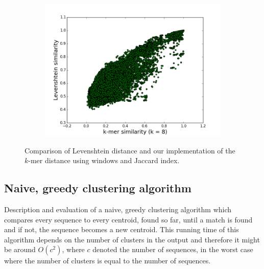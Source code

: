 \begin{figure}
  \centering
  \begin{subfigure}[b]{0.5\textwidth}
    \includegraphics[scale=0.34]{graphics/k8.png}
  \end{subfigure}
  \caption{Comparison of Levenshtein distance and our implementation of the
  $k$-mer distance using windows and Jaccard index.}
  \label{fig:Levenshtein_vs_Kmer}
\end{figure}


\subsection{Naive, greedy clustering algorithm} %
Description and evaluation of a naive, greedy clustering algorithm which
compares every sequence to every centroid, found so far, until a match is found
and if not, the sequence becomes a new centroid. This running time of this
algorithm depends on the number of clusters in the output and therefore it
might be around $O(c^2)$, where $c$ denoted the number of sequences, in the
worst case where the number of clusters is equal to the number of sequences.  %


